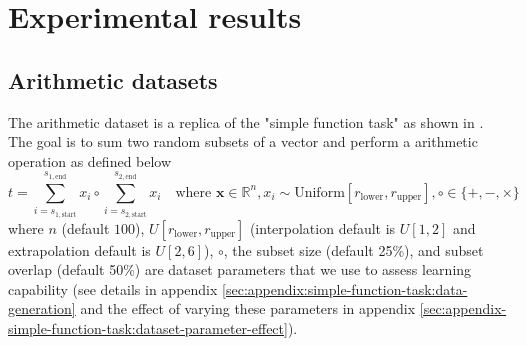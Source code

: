 \section{Experimental results}
\label{sec:experiments}

\subsection{Arithmetic datasets}
\label{sec:arithmetic-dataset}

The arithmetic dataset is a replica of the "simple function task" as shown in \cite{trask-nalu}.
The goal is to sum two random subsets of a vector and perform a arithmetic operation as defined below
\begin{equation}
t = \sum_{i = s_{1,\mathrm{start}}}^{s_{1,\mathrm{end}}} x_i \circ \sum_{i = s_{2,\mathrm{start}}}^{s_{2,\mathrm{end}}} x_i \quad \text{where } \mathbf{x} \in \mathbb{R}^n, x_i \sim \mathrm{Uniform}[r_{\mathrm{lower}}, r_{\mathrm{upper}}], \circ \in \{+, -, \times\}
\label{eq:arithmetic-problem}
\end{equation}
where $n$ (default $100$), $U[r_{\mathrm{lower}}, r_{\mathrm{upper}}]$ (interpolation default is $U[1,2]$ and extrapolation default is $U[2,6]$), $\circ$, the subset size (default 25\%), and subset overlap (default 50\%) are dataset parameters that we use to assess learning capability (see details in appendix \ref{sec:appendix:simple-function-task:data-generation} and the effect of varying these parameters in appendix \ref{sec:appendix-simple-function-task:dataset-parameter-effect}).


